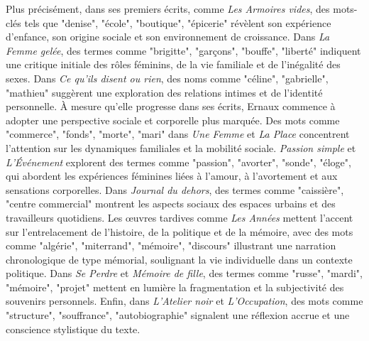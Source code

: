 Plus précisément, dans ses premiers écrits, comme \textit{Les Armoires vides}, des mots-clés tels que "denise", "école", "boutique", "épicerie" révèlent son expérience d’enfance, son origine sociale et son environnement de croissance. Dans \textit{La Femme gelée}, des termes comme "brigitte", "garçons", "bouffe", "liberté" indiquent une critique initiale des rôles féminins, de la vie familiale et de l'inégalité des sexes. Dans \textit{Ce qu’ils disent ou rien}, des noms comme "céline", "gabrielle", "mathieu" suggèrent une exploration des relations intimes et de l'identité personnelle. À mesure qu’elle progresse dans ses écrits, Ernaux commence à adopter une perspective sociale et corporelle plus marquée. Des mots comme "commerce", "fonds", "morte", "mari" dans \textit{Une Femme} et \textit{La Place} concentrent l'attention sur les dynamiques familiales et la mobilité sociale. \textit{Passion simple} et \textit{L’Événement} explorent des termes comme "passion", "avorter", "sonde", "éloge", qui abordent les expériences féminines liées à l'amour, à l'avortement et aux sensations corporelles. Dans \textit{Journal du dehors}, des termes comme "caissière", "centre commercial" montrent les aspects sociaux des espaces urbains et des travailleurs quotidiens. Les œuvres tardives comme \textit{Les Années} mettent l'accent sur l'entrelacement de l'histoire, de la politique et de la mémoire, avec des mots comme "algérie", "miterrand", "mémoire", "discours" illustrant une narration chronologique de type mémorial, soulignant la vie individuelle dans un contexte politique. Dans \textit{Se Perdre} et \textit{Mémoire de fille}, des termes comme "russe", "mardi", "mémoire", "projet" mettent en lumière la fragmentation et la subjectivité des souvenirs personnels. Enfin, dans \textit{L’Atelier noir} et \textit{L’Occupation}, des mots comme "structure", "souffrance", "autobiographie" signalent une réflexion accrue et une conscience stylistique du texte.
